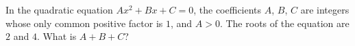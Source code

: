 In the quadratic equation $Ax^2+Bx+C=0$, the coefficients $A$, $B$, $C$ are integers whose only common positive factor is $1$, and $A>0$. The roots of the equation are $2$ and $4$. What is $A+B+C$?
